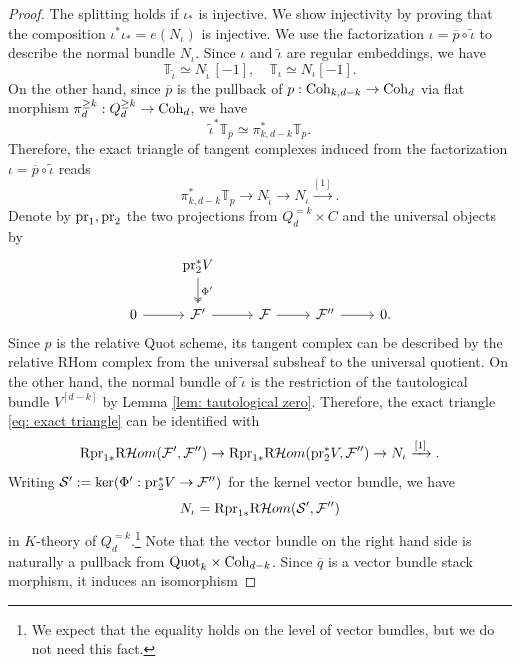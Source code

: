 \documentclass[10pt]{amsart}
\newcommand{\R}{\textnormal{R}}
\newcommand{\CS}{\mathcal{S}}
\newcommand{\CF}{\mathcal{F}}
\newcommand{\Quot}{\textnormal{Quot}}
\newcommand{\Coh}{\textnormal{Coh}}
\newcommand{\pr}{\textnormal{pr}}
\newcommand{\+}{{}^+}
\theoremstyle{definition}
\theoremstyle {definition}
\theoremstyle {definition}
\begin{document}
\begin{proof}
    The splitting holds if $\iota_*$ is injective. We show injectivity by proving that the composition $\iota^*\iota_* = e(N_\iota)$ is injective. We use the factorization $\iota=\overline{p}\circ \widetilde \iota$ to describe the normal bundle $N_\iota$. Since $\iota$ and $\widetilde\iota$ are regular embeddings, we have 
    $$\mathbb{T}_{\widetilde{\iota}}\simeq N_{\widetilde{\iota}}\,[-1],\quad \mathbb{T}_{\iota}\simeq N_{\iota}[-1]. 
    $$
    On the other hand, since $\overline{p}$ is the pullback of $p:\Coh_{k,d-k}\rightarrow \Coh_d$ via flat morphism $\pi_d^{\geq k}:Q^{\geq k}_d\rightarrow \Coh_d$, we have 
$$\widetilde\iota^*\mathbb{T}_{\overline{p}}\simeq \pi_{k, d-k}^*\mathbb{T}_p. 
    $$
    Therefore, the exact triangle of tangent complexes induced from the factorization $\iota=\overline{p}\circ \widetilde \iota$ reads
    \begin{equation}\label{eq: exact triangle}
        \pi_{k, d-k}^*\mathbb{T}_p\rightarrow N_{\widetilde \iota}\rightarrow N_\iota\xrightarrow{[1]}. 
    \end{equation}
    Denote by $\pr_1, \pr_2$ the two projections from $Q^{=k}_d\times C$ and the universal objects by 
\begin{equation*}
    \begin{tikzcd}
            & \pr_2^*V \arrow[d, two heads, "\Phi'"] &             &               &   \\
0 \arrow[r] & \CF' \arrow[r]           & \CF \arrow[r] & \CF'' \arrow[r] & 0.
\end{tikzcd}
\end{equation*}
Since $p$ is the relative Quot scheme, its tangent complex can be described by the relative RHom complex from the universal subsheaf to the universal quotient. On the other hand, the normal bundle of $\widetilde\iota$ is the restriction of the tautological bundle $V^{[d-k]}$ by Lemma \ref{lem: tautological zero}. Therefore, the exact triangle \eqref{eq: exact triangle} can be identified with
$$\R\pr_{1*}\R\mathcal{H}om(\CF',\CF'')\rightarrow
\R\pr_{1*}\R\mathcal{H}om(\pr_2^*V,\CF'')\rightarrow N_\iota\xrightarrow{[1]}. 
$$
Writing $\CS':=\ker(\Phi':\pr_2^*V\rightarrow \CF'')$ for the kernel vector bundle, we have
$$N_\iota=\R\pr_{1*}\R\mathcal{H}om(\CS',\CF'')
$$
in $K$-theory of $Q^{=k}_d$.\footnote{We expect that the equality holds on the level of vector bundles, but we do not need this fact.} Note that the vector bundle on the right hand side is naturally a pullback from $\Quot_{k}\times \Coh_{d-k}$. Since $\overline{q}$ is a vector bundle stack morphism, it induces an isomorphism 

\end{proof}
\end{document}
